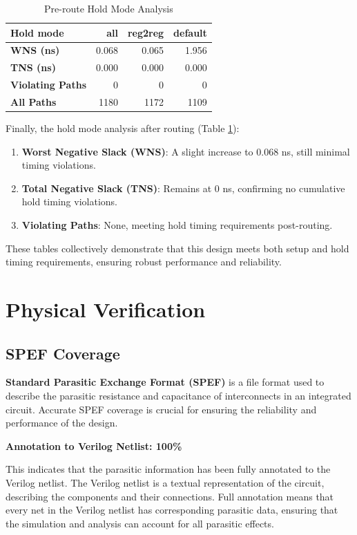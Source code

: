 \begin{table}[H]
\centering
\caption{Pre-route Hold Mode Analysis}
\begin{tabular}{|l|r|r|r|}
\hline
\textbf{Hold mode} & \textbf{all} & \textbf{reg2reg} & \textbf{default} \\ \hline
\textbf{WNS (ns)} & 0.068 & 0.065 & 1.956 \\ \hline
\textbf{TNS (ns)} & 0.000 & 0.000 & 0.000 \\ \hline
\textbf{Violating Paths} & 0 & 0 & 0 \\ \hline
\textbf{All Paths} & 1180 & 1172 & 1109 \\ \hline
\end{tabular}
\label{table:post_hold_analysis}
\end{table}
Finally, the hold mode analysis after routing (Table \ref{table:post_hold_analysis}):
\begin{enumerate}
    \item \textbf{Worst Negative Slack (WNS)}: A slight increase to 0.068 ns, still minimal timing violations.
    \item \textbf{Total Negative Slack (TNS)}: Remains at 0 ns, confirming no cumulative hold timing violations.
    \item \textbf{Violating Paths}: None, meeting hold timing requirements post-routing.
\end{enumerate}

These tables collectively demonstrate that this design meets both setup and hold timing requirements, ensuring robust performance and reliability.

\section{Physical Verification}
\subsection{SPEF Coverage}
\textbf{Standard Parasitic Exchange Format (SPEF)} is a file format used to describe the parasitic resistance and capacitance of interconnects in an integrated circuit. Accurate SPEF coverage is crucial for ensuring the reliability and performance of the design.

\textbf{Annotation to Verilog Netlist: 100\%}

This indicates that the parasitic information has been fully annotated to the Verilog netlist. The Verilog netlist is a textual representation of the circuit, describing the components and their connections. Full annotation means that every net in the Verilog netlist has corresponding parasitic data, ensuring that the simulation and analysis can account for all parasitic effects.

